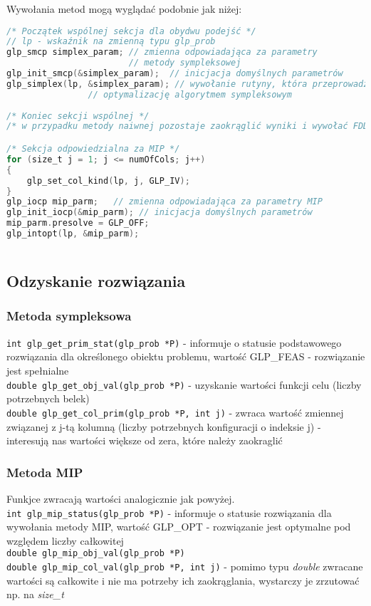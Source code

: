 Wywołania metod mogą wyglądać podobnie jak niżej:
\begin{lstlisting}[language=C]
/* Początek wspólnej sekcja dla obydwu podejść */
// lp - wskaźnik na zmienną typu glp_prob
glp_smcp simplex_param; // zmienna odpowiadająca za parametry 
                        // metody sympleksowej
glp_init_smcp(&simplex_param);  // inicjacja domyślnych parametrów
glp_simplex(lp, &simplex_param); // wywołanie rutyny, która przeprowadza 
				// optymalizację algorytmem sympleksowym
	
/* Koniec sekcji wspólnej */
/* w przypadku metody naiwnej pozostaje zaokrąglić wyniki i wywołać FDD */

/* Sekcja odpowiedzialna za MIP */
for (size_t j = 1; j <= numOfCols; j++)
{
	glp_set_col_kind(lp, j, GLP_IV);
}
glp_iocp mip_parm;   // zmienna odpowiadająca za parametry MIP
glp_init_iocp(&mip_parm); // inicjacja domyślnych parametrów
mip_parm.presolve = GLP_OFF;
glp_intopt(lp, &mip_parm);
	
\end{lstlisting}


\subsection{Odzyskanie rozwiązania}
\subsubsection{Metoda sympleksowa}
{\parindent0pt
\verb|int glp_get_prim_stat(glp_prob *P)| - informuje o statusie podstawowego rozwiązania dla określonego obiektu problemu, wartość GLP\_FEAS - rozwiązanie jest spełnialne \\
}
\verb|double glp_get_obj_val(glp_prob *P)| - uzyskanie wartości funkcji celu (liczby potrzebnych belek)  \\
\verb|double glp_get_col_prim(glp_prob *P, int j)| - zwraca wartość zmiennej związanej z j-tą kolumną (liczby potrzebnych konfiguracji o indeksie j) - interesują nas wartości większe od zera, które należy zaokraglić

\subsubsection{Metoda MIP}
Funkjce zwracają wartości analogicznie jak powyżej. \\
\verb|int glp_mip_status(glp_prob *P)| - informuje o statusie rozwiązania dla wywołania metody MIP, wartość GLP\_OPT - rozwiązanie jest optymalne pod względem liczby całkowitej \\
\verb|double glp_mip_obj_val(glp_prob *P)|\\
\verb|double glp_mip_col_val(glp_prob *P, int j)| - pomimo typu \textit{double} zwracane wartości są całkowite i nie ma potrzeby ich zaokrąglania, wystarczy je zrzutować np. na \textit{size\_t}

